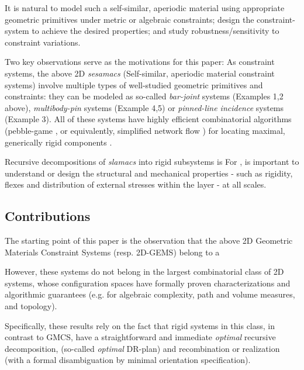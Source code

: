 It is natural to model such a self-similar, aperiodic material using appropriate geometric primitives under metric or algebraic constraints; design the 
constraint-system to achieve the desired properties; and study robustness/sensitivity to constraint variations.

Two key observations serve as the motivations for this paper:
As constraint systems, the above 2D {\em sesamacs} (Self-similar, aperiodic material constraint systems) involve multiple types of 
well-studied geometric primitives and constraints: they can be modeled as so-called
{\it bar-joint} systems (Examples 1,2 above), {\it multibody-pin} systems (Example 4,5) or {\it pinned-line incidence} systems (Example 3).  
All of these systems have highly efficient combinatorial algorithms (pebble-game \cite{XX}, or equivalently, simplified network flow \cite{XX}) 
for locating maximal, generically rigid components \cite{XX}.

Recursive decompositions of {\em slamacs} into rigid subsystems is For , is important to understand or design the structural 
and mechanical properties - such as rigidity, flexes and distribution of external stresses within the layer - at all scales.  

 

\subsection{Contributions}

The starting point of this paper is the observation that the above 2D Geometric Materials Constraint Systems (resp. 2D-GEMS) 
belong to a  

However, these systems do not 
belong in the largest combinatorial class of 2D systems, whose configuration spaces have formally proven  characterizations and 
algorithmic guarantees (e.g. for algebraic complexity, path and volume measures, and  topology).

Specifically, these results  rely on the fact that rigid systems in this  class, in contrast to GMCS, 
have a straightforward and immediate {\sl optimal} recursive decomposition, (so-called {\sl optimal} DR-plan) and  recombination 
or realization (with a formal disambiguation by minimal orientation specification).

